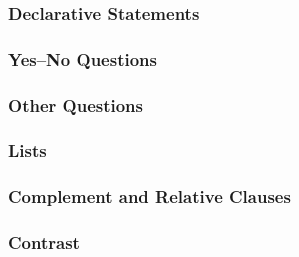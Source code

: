 \subsubsection{Declarative Statements}

\subsubsection{Yes--No Questions}

\subsubsection{Other Questions}

\subsubsection{Lists}

\subsubsection{Complement and Relative Clauses}

\subsubsection{Contrast}


